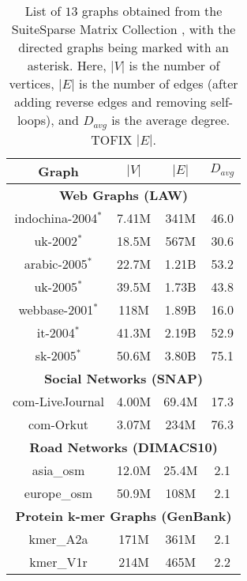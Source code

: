 \begin{table}[hbtp]
  \centering
  \caption{List of $13$ graphs obtained from the SuiteSparse Matrix Collection \cite{suite19}, with the directed graphs being marked with an asterisk. Here, $|V|$ is the number of vertices, $|E|$ is the number of edges (after adding reverse edges and removing self-loops), and $D_{avg}$ is the average degree. TOFIX $|E|$.}
  \label{tab:dataset}
  \begin{tabular}{|c||c|c|c|}
    \toprule
    \textbf{Graph} &
    \textbf{\textbf{$|V|$}} &
    \textbf{\textbf{$|E|$}} &
    \textbf{\textbf{$D_{avg}$}} \\
    \midrule
    \multicolumn{4}{|c|}{\textbf{Web Graphs (LAW)}} \\ \hline
    indochina-2004$^*$ & 7.41M & 341M & 46.0 \\ \hline
    uk-2002$^*$ & 18.5M & 567M & 30.6 \\ \hline
    arabic-2005$^*$ & 22.7M & 1.21B & 53.2 \\ \hline
    uk-2005$^*$ & 39.5M & 1.73B & 43.8 \\ \hline
    webbase-2001$^*$ & 118M & 1.89B & 16.0 \\ \hline
    it-2004$^*$ & 41.3M & 2.19B & 52.9 \\ \hline
    sk-2005$^*$ & 50.6M & 3.80B & 75.1 \\ \hline
    \multicolumn{4}{|c|}{\textbf{Social Networks (SNAP)}} \\ \hline
    com-LiveJournal & 4.00M & 69.4M & 17.3 \\ \hline
    com-Orkut & 3.07M & 234M & 76.3 \\ \hline
    \multicolumn{4}{|c|}{\textbf{Road Networks (DIMACS10)}} \\ \hline
    asia\_osm & 12.0M & 25.4M & 2.1 \\ \hline
    europe\_osm & 50.9M & 108M & 2.1 \\ \hline
    \multicolumn{4}{|c|}{\textbf{Protein k-mer Graphs (GenBank)}} \\ \hline
    kmer\_A2a & 171M & 361M & 2.1 \\ \hline
    kmer\_V1r & 214M & 465M & 2.2 \\ \hline
  \bottomrule
  \end{tabular}
\end{table}

